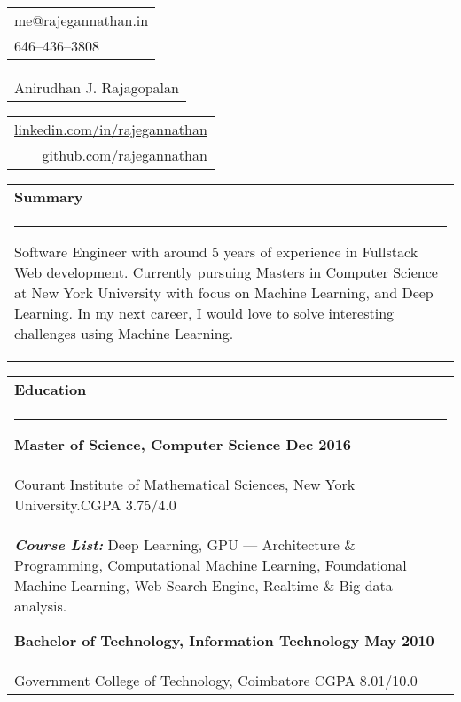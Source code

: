 \documentclass{article}
\begin{document}
{\small\begin{tabular}[c]{l}
	me@rajegannathan.in \\
	646--436--3808
\end{tabular}}\hfill%
{\Large\bfseries\begin{tabular}[c]{c}
	Anirudhan J. Rajagopalan
\end{tabular}}\hfill%
{\small\begin{tabular}[c]{r}
	\href{https://linkedin.com/in/rajegannathan}{linkedin.com/in/rajegannathan} \\
	\href{https://github.com/rajegannathan}{github.com/rajegannathan}
\end{tabular}}%

\bigskip

\begin{tabular}{p{\dimexpr\linewidth-2\tabcolsep}}
	\textbf{\large{Summary}}\\
	\noindent\rule{\textwidth}{0.4pt}
	\begin{adjustwidth}{0.5cm}{0.5cm}
	\small{Software Engineer with around 5 years of experience in Fullstack Web development. Currently pursuing Masters in Computer Science at New York University with focus on Machine Learning, and Deep Learning.  In my next career, I would love to solve interesting challenges using Machine Learning.}
	\end{adjustwidth}
\end{tabular}

\begin{tabular}{p{\dimexpr\linewidth-2\tabcolsep}}
	\textbf{\large{Education}} \\
	\noindent\rule{\textwidth}{0.4pt}
	{\bfseries Master of Science, Computer Science \hfill Dec 2016} \\
	\quad Courant Institute of Mathematical Sciences, New York University.\hfill CGPA 3.75/4.0\\
	\quad \textbf{\textit{Course List:}} Deep Learning, GPU --- Architecture \& Programming, Computational Machine Learning, Foundational Machine Learning, Web Search Engine, Realtime \& Big data analysis.

	\smallskip
	{\bfseries Bachelor of Technology, Information Technology \hfill May 2010} \\
	\quad Government College of Technology, Coimbatore \hfill CGPA 8.01/10.0
\end{tabular}

\bigskip
\end{document}
